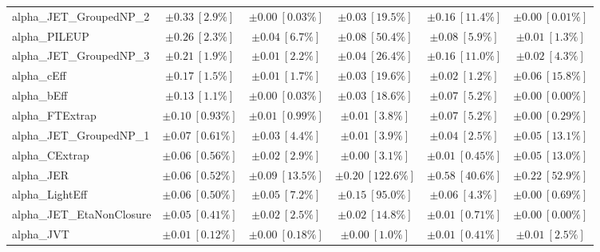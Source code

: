 \begin{sidewaystable}
\begin{center}
\begin{tabular*}{\textwidth}{@{\extracolsep{\fill}}lccccc}
alpha\_JET\_GroupedNP\_2         & $\pm 0.33\ [2.9\%] $          & $\pm 0.00\ [0.03\%] $          & $\pm 0.03\ [19.5\%] $          & $\pm 0.16\ [11.4\%] $          & $\pm 0.00\ [0.01\%] $       \\
alpha\_PILEUP         & $\pm 0.26\ [2.3\%] $          & $\pm 0.04\ [6.7\%] $          & $\pm 0.08\ [50.4\%] $          & $\pm 0.08\ [5.9\%] $          & $\pm 0.01\ [1.3\%] $       \\
alpha\_JET\_GroupedNP\_3         & $\pm 0.21\ [1.9\%] $          & $\pm 0.01\ [2.2\%] $          & $\pm 0.04\ [26.4\%] $          & $\pm 0.16\ [11.0\%] $          & $\pm 0.02\ [4.3\%] $       \\
alpha\_cEff         & $\pm 0.17\ [1.5\%] $          & $\pm 0.01\ [1.7\%] $          & $\pm 0.03\ [19.6\%] $          & $\pm 0.02\ [1.2\%] $          & $\pm 0.06\ [15.8\%] $       \\
alpha\_bEff         & $\pm 0.13\ [1.1\%] $          & $\pm 0.00\ [0.03\%] $          & $\pm 0.03\ [18.6\%] $          & $\pm 0.07\ [5.2\%] $          & $\pm 0.00\ [0.00\%] $       \\
alpha\_FTExtrap         & $\pm 0.10\ [0.93\%] $          & $\pm 0.01\ [0.99\%] $          & $\pm 0.01\ [3.8\%] $          & $\pm 0.07\ [5.2\%] $          & $\pm 0.00\ [0.29\%] $       \\
alpha\_JET\_GroupedNP\_1         & $\pm 0.07\ [0.61\%] $          & $\pm 0.03\ [4.4\%] $          & $\pm 0.01\ [3.9\%] $          & $\pm 0.04\ [2.5\%] $          & $\pm 0.05\ [13.1\%] $       \\
alpha\_CExtrap         & $\pm 0.06\ [0.56\%] $          & $\pm 0.02\ [2.9\%] $          & $\pm 0.00\ [3.1\%] $          & $\pm 0.01\ [0.45\%] $          & $\pm 0.05\ [13.0\%] $       \\
alpha\_JER         & $\pm 0.06\ [0.52\%] $          & $\pm 0.09\ [13.5\%] $          & $\pm 0.20\ [122.6\%] $          & $\pm 0.58\ [40.6\%] $          & $\pm 0.22\ [52.9\%] $       \\
alpha\_LightEff         & $\pm 0.06\ [0.50\%] $          & $\pm 0.05\ [7.2\%] $          & $\pm 0.15\ [95.0\%] $          & $\pm 0.06\ [4.3\%] $          & $\pm 0.00\ [0.69\%] $       \\
alpha\_JET\_EtaNonClosure         & $\pm 0.05\ [0.41\%] $          & $\pm 0.02\ [2.5\%] $          & $\pm 0.02\ [14.8\%] $          & $\pm 0.01\ [0.71\%] $          & $\pm 0.00\ [0.00\%] $       \\
alpha\_JVT         & $\pm 0.01\ [0.12\%] $          & $\pm 0.00\ [0.18\%] $          & $\pm 0.00\ [1.0\%] $          & $\pm 0.01\ [0.41\%] $          & $\pm 0.01\ [2.5\%] $       \\

\end{tabular*}
\end{center}
\end{sidewaystable}
